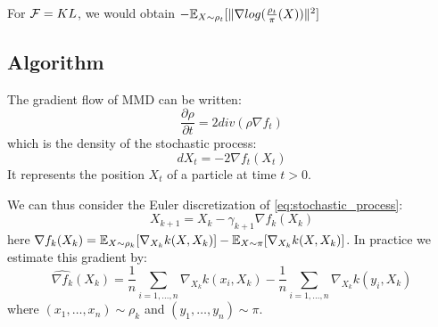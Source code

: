 \begin{remark}
	For ${{\mathcal F}}=KL$, we would obtain $-{{\mathbb E}}_{X \sim \rho_t}[\|\nabla log(\frac{\rho_t}{\pi}(X))\|^2]$
\end{remark}




\subsection{Algorithm}

The gradient flow of MMD can be written:
\begin{equation*}
\frac{\partial \rho}{\partial t}= 2 div(\rho  \nabla f_t)
\end{equation*}
which is the density of the stochastic process:
\begin{equation}\label{eq:stochastic_process}
dX_t=-2\nabla f_t(X_t) 
\end{equation}
It represents the position $X_t$ of a particle at time $t > 0$.


We can thus consider the Euler discretization of \eqref{eq:stochastic_process}:
\begin{equation}\label{eq:discretization}
X_{k+1}=X_k - \gamma_{k+1} \nabla f_k(X_k)
\end{equation}
here $\nabla f_k(X_k)= {{\mathbb E}}_{X \sim \rho_k}[\nabla_{X_k}k(X,X_k)] -  {{\mathbb E}}_{X \sim \pi}[\nabla_{X_k}k(X,X_k)]$.
In practice we estimate this gradient by:
\begin{equation*}
\widehat{\nabla f_k}(X_k)=\frac{1}{n}\sum_{i=1,\dots,n}\nabla_{X_k}k(x_i,X_k) - \frac{1}{n}\sum_{i=1,\dots,n}\nabla_{X_k}k(y_i,X_k)
\end{equation*}
where $(x_1, \dots, x_n)\sim \rho_k$ and $(y_1, \dots, y_n)\sim \pi$.